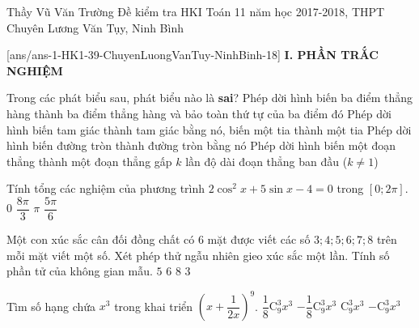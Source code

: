 \begin{name}
	{Thầy Vũ Văn Trường}
	{Đề kiểm tra HKI Toán 11 năm học 2017-2018, THPT Chuyên Lương Văn Tụy, Ninh Bình}
\end{name}
\setcounter{ex}{0}\setcounter{bt}{0}
[ans/ans-1-HK1-39-ChuyenLuongVanTuy-NinhBinh-18]
\noindent\textbf{I. PHẦN TRẮC NGHIỆM}
\begin{ex}%
Trong các phát biểu sau, phát biểu nào là \textbf{sai}?
\choice
{Phép dời hình biến ba điểm thẳng hàng thành ba điểm thẳng hàng và bảo toàn thứ tự của ba điểm đó}
{Phép dời hình biến tam giác thành tam giác bằng nó, biến một tia thành một tia}
{Phép dời hình biến đường tròn thành đường tròn bằng nó}
{\True Phép dời hình biến một đoạn thẳng thành một đoạn thẳng gấp $k$ lần độ dài đoạn thẳng ban đầu ($k\neq 1$)}
\end{ex}
\begin{ex}%
Tính tổng các nghiệm của phương trình $2\cos^2x+5\sin x-4=0$ trong $[0;2\pi]$.
\choice
{$0$}
{$\dfrac{8\pi}{3}$}
{\True $\pi$}
{$\dfrac{5\pi}{6}$}
\end{ex}
\begin{ex}%
Một con xúc sắc cân đối đồng chất có $6$ mặt được viết các số $3;4;5;6;7;8$ trên mỗi mặt viết một số. Xét phép thử ngẫu nhiên gieo xúc sắc một lần. Tính số phần tử của không gian mẫu.
\choice
{$5$}
{\True $6$}
{$8$}
{$3$}
\end{ex}
\begin{ex}%
Tìm số hạng chứa $x^3$ trong khai triển $\left(x+\dfrac{1}{2x}\right)^9$.
\choice
{\True $\dfrac{1}{8}\mathrm{C}_9^3x^3$}
{$-\dfrac{1}{8}\mathrm{C}_9^3x^3$}
{$\mathrm{C}_9^3x^3$}
{$-\mathrm{C}_9^3x^3$}
\end{ex}
